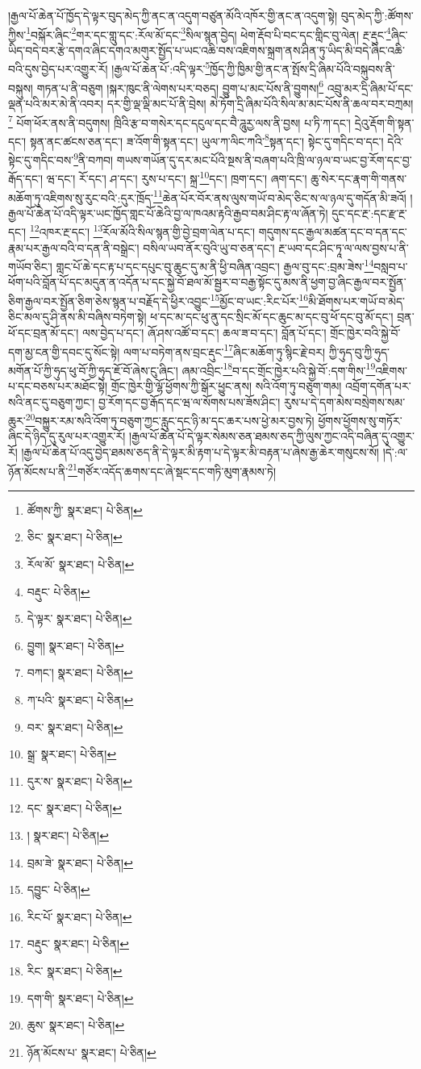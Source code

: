 །རྒྱལ་པོ་ཆེན་པོ་ཁྱོད་དེ་ལྟར་བུད་མེད་ཀྱི་ནང་ན་འདུག་བཙུན་མོའི་འཁོར་གྱི་ནང་ན་འདུག་སྟེ། བུད་མེད་ཀྱི་:ཚོགས་ཀྱིས་\footnote{ཚོགས་ཀྱི་  སྣར་ཐང་།  པེ་ཅིན། }བསྐོར་ཞིང་\footnote{ཅིང་  སྣར་ཐང་།  པེ་ཅིན། }གར་དང་གླུ་དང་:རོལ་མོ་དང་\footnote{རོལ་མོ་  སྣར་ཐང་།  པེ་ཅིན། }སིལ་སྙན་བྱེད། ཕེག་རྡོབ་པི་བང་དང་གླིང་བུ་ལེན། རྔ་རྡུང་\footnote{བརྡུང་  པེ་ཅིན། }ཞིང་ཡིད་བདེ་བར་རྩེ་དགའ་ཞིང་དགའ་མགུར་སྤྱོད་པ་ཡང་འཆི་བས་འཇིགས་སྐྲག་ནས་ཤིན་ཏུ་ཡིད་མི་བདེ་ཞིང་འཆི་བའི་དུས་བྱེད་པར་འགྱུར་རོ། །རྒྱལ་པོ་ཆེན་པོ་:འདི་ལྟར་\footnote{དེ་ལྟར་  སྣར་ཐང་།  པེ་ཅིན། }ཁྱོད་ཀྱི་ཁྱིམ་གྱི་ནང་ན་སྤོས་དྲི་ཞིམ་པོའི་བསྐུབས་ནི་བསྐུས། གཏན་པ་ནི་བཅུག །སྐར་ཁུང་ནི་ལེགས་པར་བཅད། བྱུག་པ་མང་པོས་ནི་བྱུགས།\footnote{བྱུག།  སྣར་ཐང་།  པེ་ཅིན། } འབྲུ་མར་དྲི་ཞིམ་པོ་དང་ལྡན་པའི་མར་མེ་ནི་འབར། དར་གྱི་ལྡ་ལྡི་མང་པོ་ནི་བྲེས། མེ་ཏོག་དྲི་ཞིམ་པོའི་སིལ་མ་མང་པོས་ནི་ཆལ་བར་བཀྲམ།\footnote{བཀང་།  སྣར་ཐང་།  པེ་ཅིན། } པོག་ཕོར་ནས་ནི་བདུགས། ཁྲིའི་རྩ་བ་གསེར་དང་དངུལ་དང་བཻ་ཌཱུརྱ་ལས་ནི་བྱས། པ་ཏི་ཀ་དང་། དྲེའུ་རྡོག་གི་སྟན་དང་། སྟན་ནང་ཚངས་ཅན་དང་། ཟ་འོག་གི་སྟན་དང་། ཡུལ་ཀ་ལིང་ཀའི་\footnote{ཀ་པའི་  སྣར་ཐང་།  པེ་ཅིན། }སྟན་དང་། སྟེང་དུ་གདིང་བ་དང་། དེའི་སྟེང་དུ་གདིང་བས་\footnote{བར་  སྣར་ཐང་།  པེ་ཅིན། }ནི་བཀབ། གཡས་གཡོན་དུ་དར་མང་པོའི་སྔས་ནི་བཞག་པའི་ཁྲི་ལ་ཉལ་བ་ཡང་བྱ་རོག་དང་བྱ་རྒོད་དང་། ཝ་དང་། རོ་དང་། ཤ་དང་། རུས་པ་དང་། སྐྲ་\footnote{སྒྲ་  སྣར་ཐང་།  པེ་ཅིན། }དང་། ཁྲག་དང་། ཞག་དང་། ཆུ་སེར་དང་རྣག་གི་གནས་མཆོག་ཏུ་འཇིགས་སུ་རུང་བའི་:དུར་ཁྲོད་\footnote{དུར་ས་  སྣར་ཐང་།  པེ་ཅིན། }ཆེན་པོར་བོར་ནས་ལུས་གཡོ་བ་མེད་ཅིང་ས་ལ་ཉལ་དུ་གདོན་མི་ཟའོ། །རྒྱལ་པོ་ཆེན་པོ་འདི་ལྟར་ཡང་ཁྱོད་གླང་པོ་ཆེའི་བྱ་ལ་ཁའམ་རྟའི་རྒྱབ་བམ་ཤིང་རྟ་ལ་ཞོན་ཏེ། དུང་དང་རྔ་:དང་རྫ་རྔ་དང་། \footnote{དང་  སྣར་ཐང་།  པེ་ཅིན། }འཁར་རྔ་དང་། \footnote{།    སྣར་ཐང་།  པེ་ཅིན། }རོལ་མོའི་སིལ་སྙན་གྱི་བྱེ་བྲག་ལེན་པ་དང་། གདུགས་དང་རྒྱལ་མཚན་དང་བ་དན་དང་རྣམ་པར་རྒྱལ་བའི་བ་དན་ནི་བསྒྲེང་། བསིལ་ཡབ་ནོར་བུའི་ཡུ་བ་ཅན་དང་། རྔ་ཡབ་དང་ཤིང་ཏཱ་ལ་ལས་བྱས་པ་ནི་གཡོབ་ཅིང་། གླང་པོ་ཆེ་དང་རྟ་པ་དང་དཔུང་བུ་ཆུང་དུ་མ་ནི་ཕྱི་བཞིན་འབྲང་། རྒྱལ་བུ་དང་:བྲམ་ཟེས་\footnote{བྲམ་ཟེ་  སྣར་ཐང་།  པེ་ཅིན། }བསླབ་པ་ཕོག་པའི་བློན་པོ་དང་མདུན་ན་འདོན་པ་དང་སྐྱེ་བོ་ཐལ་མོ་སྦྱར་བ་བརྒྱ་སྟོང་དུ་མས་ནི་ཕྱག་བྱ་ཞིང་རྒྱལ་བར་སྤྱོན་ཅིག་རྒྱལ་བར་སྤྱོན་ཅིག་ཅེས་སྙན་པ་བརྗོད་དེ་ཕྱིར་འབྱུང་\footnote{དབྱུང་  པེ་ཅིན། }མྱོང་བ་ཡང་:རིང་པོར་\footnote{རིང་པོ་  སྣར་ཐང་།  པེ་ཅིན། }མི་ཐོགས་པར་གཡོ་བ་མེད་ཅིང་མལ་དུ་ཤི་ནས་མི་བཞིས་བཏེག་སྟེ། ཕ་དང་མ་དང་ཕུ་ནུ་དང་སྲིང་མོ་དང་ཆུང་མ་དང་བུ་ཕོ་དང་བུ་མོ་དང་། བྲན་ཕོ་དང་བྲན་མོ་དང་། ལས་བྱེད་པ་དང་། ཞོ་ཤས་འཚོ་བ་དང་། ཆལ་ཟ་བ་དང་། བློན་པོ་དང་། གྲོང་ཁྱེར་བའི་སྐྱེ་བོ་དག་མྱ་ངན་གྱི་དབང་དུ་སོང་སྟེ། ལག་པ་བཏེག་ནས་བྲང་རྡུང་\footnote{བརྡུང་  སྣར་ཐང་།  པེ་ཅིན། }ཞིང་མཆོག་ཏུ་སྙིང་རྗེ་བར། ཀྱི་ཧུད་བུ་ཀྱི་ཧུད་མགོན་པོ་ཀྱི་ཧུད་ཕུ་བོ་ཀྱི་ཧུད་ཇོ་བོ་ཞེས་ངུ་ཞིང་། ཞམ་འབྲིང་\footnote{རིང་  སྣར་ཐང་།  པེ་ཅིན། }བ་དང་གྲོང་ཁྱེར་པའི་སྐྱེ་བོ་:དག་གིས་\footnote{དག་གི་  སྣར་ཐང་།  པེ་ཅིན། }འཇིགས་པ་དང་བཅས་པར་མཐོང་སྟེ། གྲོང་ཁྱེར་གྱི་ལྷོ་ཕྱོགས་ཀྱི་སྒོར་ཕྱུང་ནས། སའི་འོག་ཏུ་བཅུག་གམ། འབྲོག་དགོན་པར་སའི་ནང་དུ་བཅུག་ཀྱང་། བྱ་རོག་དང་བྱ་རྒོད་དང་ཝ་ལ་སོགས་པས་ཟོས་ཤིང་། རུས་པ་དེ་དག་མེས་བསྲེགས་སམ་ཆུར་\footnote{ཆུས་  སྣར་ཐང་།  པེ་ཅིན། }བསྐྱུར་རམ་སའི་འོག་ཏུ་བཅུག་ཀྱང་རླུང་དང་ཉི་མ་དང་ཆར་པས་ཕྱེ་མར་བྱས་ཏེ། ཕྱོགས་ཕྱོགས་སུ་གཏོར་ཞིང་དེ་ཉིད་དུ་རུལ་པར་འགྱུར་རོ། །རྒྱལ་པོ་ཆེན་པོ་དེ་ལྟར་སེམས་ཅན་ཐམས་ཅད་ཀྱི་ལུས་ཀྱང་འདི་བཞིན་དུ་འགྱུར་རོ། །རྒྱལ་པོ་ཆེན་པོ་འདུ་བྱེད་ཐམས་ཅད་ནི་དེ་ལྟར་མི་རྟག་པ་དེ་ལྟར་མི་བརྟན་པ་ཞེས་རྒྱ་ཆེར་གསུངས་སོ། །དེ་:ལ་ཉོན་མོངས་པ་ནི་\footnote{ཉོན་མོངས་པ་  སྣར་ཐང་།  པེ་ཅིན། }གཙོར་འདོད་ཆགས་དང་ཞེ་སྡང་དང་གཏི་མུག་རྣམས་ཏེ། 